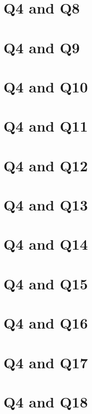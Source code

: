 \documentclass{report}
\begin{document}
\clearpage
\section{Q4 and Q8}


\clearpage
\section{Q4 and Q9}


\clearpage
\section{Q4 and Q10}


\clearpage
\section{Q4 and Q11}


\clearpage
\section{Q4 and Q12}


\clearpage
\section{Q4 and Q13}


\clearpage
\section{Q4 and Q14}


\clearpage
\section{Q4 and Q15}


\clearpage
\section{Q4 and Q16}


\clearpage
\section{Q4 and Q17}


\clearpage
\section{Q4 and Q18}

\end{document}
